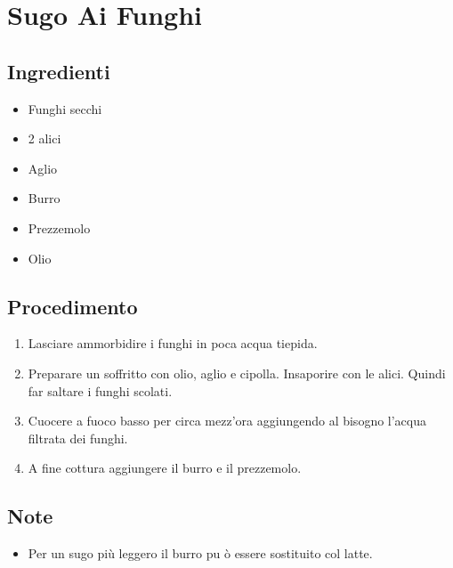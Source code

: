 \section{Sugo Ai Funghi}
\subsection{Ingredienti}
\begin{itemize}
\item Funghi secchi  
\item 2 alici  
\item Aglio  
\item Burro  
\item Prezzemolo  
\item Olio
\end{itemize}
\subsection{Procedimento}
\begin{enumerate}
\item  Lasciare ammorbidire i funghi in poca acqua tiepida.  
\item  Preparare un soffritto con olio, aglio e cipolla. Insaporire con le alici. Quindi far saltare i funghi scolati.  
\item  Cuocere a fuoco basso per circa mezz'ora aggiungendo al bisogno l'acqua filtrata dei funghi.  
\item  A fine cottura aggiungere il burro e il prezzemolo.
\end{enumerate}
\subsection{Note}
\begin{itemize}
\item Per un sugo più leggero il burro pu ò essere sostituito col latte.
\end{itemize}
